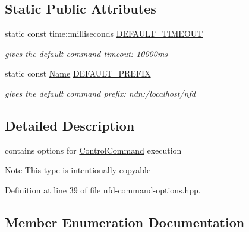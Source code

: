 \subsection*{Static Public Attributes}
\begin{DoxyCompactItemize}
\item 
static const time\+::milliseconds \hyperlink{classndn_1_1nfd_1_1CommandOptions_a1af36dc55ce0311236a8d0c57724e340}{D\+E\+F\+A\+U\+L\+T\+\_\+\+T\+I\+M\+E\+O\+UT}\hypertarget{classndn_1_1nfd_1_1CommandOptions_a1af36dc55ce0311236a8d0c57724e340}{}\label{classndn_1_1nfd_1_1CommandOptions_a1af36dc55ce0311236a8d0c57724e340}

\begin{DoxyCompactList}\small\item\em gives the default command timeout\+: 10000ms \end{DoxyCompactList}\item 
static const \hyperlink{classndn_1_1Name}{Name} \hyperlink{classndn_1_1nfd_1_1CommandOptions_a9fd982f233bb82c2a93b2be263eefd15}{D\+E\+F\+A\+U\+L\+T\+\_\+\+P\+R\+E\+F\+IX}\hypertarget{classndn_1_1nfd_1_1CommandOptions_a9fd982f233bb82c2a93b2be263eefd15}{}\label{classndn_1_1nfd_1_1CommandOptions_a9fd982f233bb82c2a93b2be263eefd15}

\begin{DoxyCompactList}\small\item\em gives the default command prefix\+: ndn\+:/localhost/nfd \end{DoxyCompactList}\end{DoxyCompactItemize}


\subsection{Detailed Description}
contains options for \hyperlink{classndn_1_1nfd_1_1ControlCommand}{Control\+Command} execution 

\begin{DoxyNote}{Note}
This type is intentionally copyable 
\end{DoxyNote}


Definition at line 39 of file nfd-\/command-\/options.\+hpp.



\subsection{Member Enumeration Documentation}
